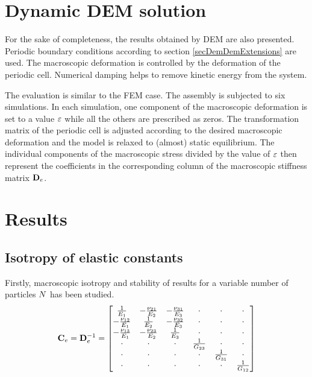 \section{Dynamic DEM solution}
For the sake of completeness, the results obtained by DEM are also presented.
Periodic boundary conditions according to section \ref{secDemDemExtensions} are used.
The macroscopic deformation is controlled by the deformation of the periodic cell.
Numerical damping helps to remove kinetic energy from the system.

The evaluation is similar to the FEM case.
The assembly is subjected to six simulations.
In each simulation, one component of the macroscopic deformation
is set to a  value $\varepsilon$ while all the others are prescribed as zeros.
The transformation matrix of the periodic cell is adjusted according to the desired macroscopic deformation and the model is relaxed to (almost) static equilibrium.
The individual components of the macroscopic stress divided by the value of $\varepsilon$ then represent the coefficients in the corresponding column of the macroscopic stiffness matrix $\stiffnessMatrixElastic$.





\section{Results}

\subsection{Isotropy of elastic constants}\label{secMacropropertiesResultsIsotropy}
Firstly, macroscopic isotropy and stability of results for a variable number of particles $N$ has been studied.
\begin{equation}
	\complianceMatrixElastic = \stiffnessMatrixElastic\inv
	=
	\begin{bmatrix}
		\frac{1}{\youngModulus_1} & -\frac{\poissonRatio_{21}}{\youngModulus_2} & -\frac{\poissonRatio_{31}}{\youngModulus_3} & \cdot & \cdot & \cdot \\
		-\frac{\poissonRatio_{12}}{\youngModulus_1} & \frac{1}{\youngModulus_2} & -\frac{\poissonRatio_{32}}{\youngModulus_3} & \cdot & \cdot & \cdot \\
		-\frac{\poissonRatio_{13}}{\youngModulus_1} & -\frac{\poissonRatio_{23}}{\youngModulus_2} & \frac{1}{\youngModulus_3} & \cdot & \cdot & \cdot \\
		\cdot & \cdot & \cdot & \frac{1}{\shearModulus_{23}} & \cdot & \cdot \\
		\cdot & \cdot & \cdot & \cdot & \frac{1}{\shearModulus_{31}} & \cdot \\
		\cdot & \cdot & \cdot & \cdot & \cdot & \frac{1}{\shearModulus_{12}}
	\end{bmatrix}
	\label{eqMacroPropertiesElasticResultsOrthotropicComliance}
\end{equation}

